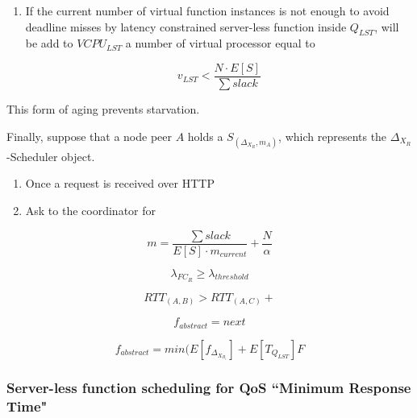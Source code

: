 \documentclass[10pt,a4paper]{article}
\theoremstyle{definition}
\begin{document}
\begin{enumerate}
\item If the current number of virtual function instances is not enough to avoid deadline misses by latency constrained server-less function inside $Q_{LST}$, will be add to $VCPU_{LST}$ a number of virtual processor equal to 

\begin{equation}
v_{LST} < \dfrac{N \cdot E[S]}{\sum slack} 
\end{equation}


\end{enumerate}



This form of aging prevents starvation. 


Finally, suppose that a node peer $A$ holds a $S_{(\Delta_{X_{R}},m_A)}$, which represents the 
$\Delta_{X_{R}}$-Scheduler object.

\begin{enumerate}
\item Once a request is received over HTTP
\item Ask to the coordinator for 
\end{enumerate}


\begin{equation}
m = \dfrac{\sum slack}{E[S] \cdot m_{current}} + \dfrac{N}{\alpha}
\end{equation}

\begin{equation}
\lambda_{FC_R} \geq \lambda_{threshold} 
\end{equation}


\begin{equation}
RTT_{(A,B)} > RTT_{(A,C)} + 
\end{equation}

\begin{equation}
f_{abstract} = next 
\end{equation}

\begin{equation}
f_{abstract} = min(E[f_{\Delta_{X_{R_i}}}] + E[T_{Q_{LST}}] F
\end{equation}






\subsubsection{Server-less function scheduling for QoS ``Minimum Response Time"}
\end{document}
